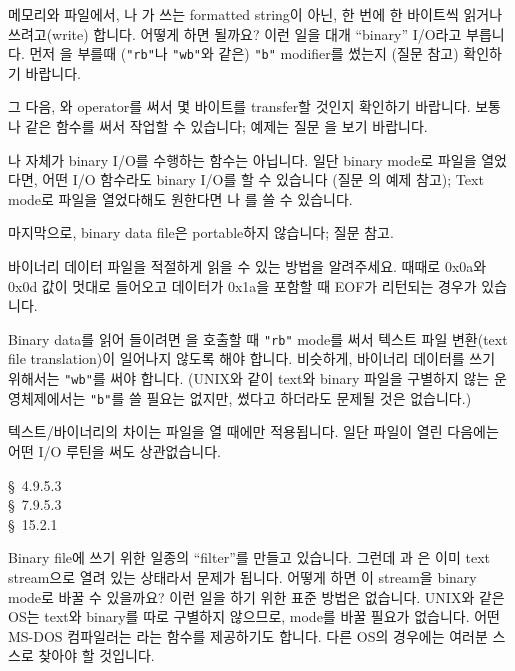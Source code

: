 \begin{faq}
	메모리와 파일에서, 나 가 쓰는 formatted
	string이 아닌, 한 번에 한 바이트씩 읽거나 쓰려고(write)
	합니다.  어떻게 하면 될까요?
\A
	이런 일을 대개 ``binary'' I/O라고 부릅니다.
	먼저 을 부를때 (\verb+"rb"+나 \verb+"wb"+와 같은)
	\verb+"b"+ modifier를 썼는지 (질문  참고) 확인하기 바랍니다.

	그 다음, \TT{\&}와  operator를 써서 몇 바이트를
	transfer할 것인지 확인하기 바랍니다.  보통 나 같은
	함수를 써서 작업할 수 있습니다; 예제는 질문 을 보기 바랍니다.

	나  자체가 binary I/O를 수행하는 함수는 아닙니다.
	일단 binary mode로 파일을 열었다면, 어떤 I/O 함수라도 binary I/O를
	할 수 있습니다 (질문 의 예제 참고);  Text mode로 파일을 열었다해도
	원한다면 나 를 쓸 수 있습니다.

	마지막으로, binary data file은 portable하지 않습니다; 질문  참고.
\end{faq}


\begin{faq}
	바이너리 데이터 파일을 적절하게 읽을 수 있는 방법을 알려주세요.
	때때로 0x0a와 0x0d 값이 멋대로 들어오고 데이터가 0x1a을 포함할 때
	EOF가 리턴되는 경우가 있습니다.

\A
	Binary data를 읽어 들이려면 을 호출할 때 \verb+"rb"+
	mode를 써서 텍스트 파일 변환(text file translation)이 
	일어나지 않도록 해야 합니다.
	비슷하게, 바이너리 데이터를 쓰기 위해서는 \verb+"wb"+를 써야 합니다.
	(UNIX와 같이 text와 binary 파일을 구별하지 않는 운영체제에서는
	\verb+"b"+를 쓸 필요는 없지만, 썼다고 하더라도 문제될 것은 없습니다.)

	텍스트/바이너리의 차이는 파일을 열 때에만 적용됩니다.  일단 파일이
	열린 다음에는 어떤 I/O 루틴을 써도 상관없습니다.


\R
	\cite{ansi} \S\ 4.9.5.3 \\
	\cite{c89} \S\ 7.9.5.3 \\
	\cite{hs} \S\ 15.2.1 
\end{faq}

\begin{faq}
	Binary file에 쓰기 위한 일종의 ``filter''를 만들고 있습니다.
	그런데 과 은 이미 text stream으로 열려 있는
	상태라서 문제가 됩니다. 어떻게 하면 이 stream을 binary mode로
	바꿀 수 있을까요?
\A
	이런 일을 하기 위한 표준 방법은 없습니다.
	UNIX와 같은 OS는 text와 binary를 따로 구별하지 않으므로,
        mode를 바꿀 필요가
	없습니다.  어떤 MS-DOS 컴파일러는 라는 함수를
	제공하기도 합니다.  다른 OS의 경우에는 여러분 스스로
	찾아야 할 것입니다.
\end{faq}

